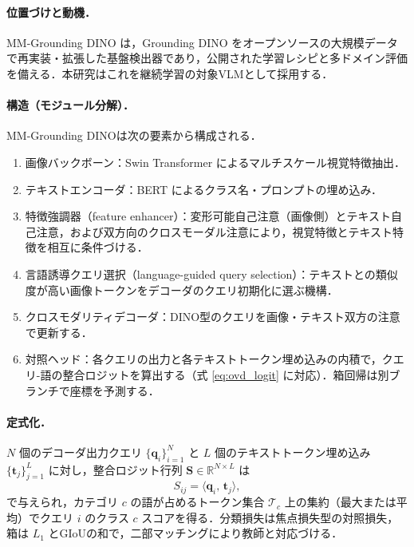 \paragraph{位置づけと動機．}
MM-Grounding DINO \cite{mmgdino} は，Grounding DINO \cite{groundingdino} をオープンソースの大規模データで再実装・拡張した基盤検出器であり，公開された学習レシピと多ドメイン評価を備える．本研究はこれを継続学習の対象VLMとして採用する．

\paragraph{構造（モジュール分解）．}
MM-Grounding DINOは次の要素から構成される．
\begin{enumerate}
\item 画像バックボーン：Swin Transformer によるマルチスケール視覚特徴抽出．
\item テキストエンコーダ：BERT によるクラス名・プロンプトの埋め込み．
\item 特徴強調器（feature enhancer）：変形可能自己注意（画像側）とテキスト自己注意，および双方向のクロスモーダル注意により，視覚特徴とテキスト特徴を相互に条件づける．
\item 言語誘導クエリ選択（language-guided query selection）：テキストとの類似度が高い画像トークンをデコーダのクエリ初期化に選ぶ機構．
\item クロスモダリティデコーダ：DINO型のクエリを画像・テキスト双方の注意で更新する．
\item 対照ヘッド：各クエリの出力と各テキストトークン埋め込みの内積で，クエリ-語の整合ロジットを算出する（式 \eqref{eq:ovd_logit} に対応）．箱回帰は別ブランチで座標を予測する．
\end{enumerate}

\paragraph{定式化．}
$N$ 個のデコーダ出力クエリ $\{\mathbf{q}_{i}\}_{i=1}^{N}$ と $L$ 個のテキストトークン埋め込み $\{\mathbf{t}_{j}\}_{j=1}^{L}$ に対し，整合ロジット行列 $\mathbf{S} \in \mathbb{R}^{N \times L}$ は
\begin{equation}
S_{ij} = \langle \mathbf{q}_{i},\, \mathbf{t}_{j}\rangle,
\label{eq:mmg_logit}
\end{equation}
で与えられ，カテゴリ $c$ の語が占めるトークン集合 $\mathcal{T}_{c}$ 上の集約（最大または平均）でクエリ $i$ のクラス $c$ スコアを得る．分類損失は焦点損失型の対照損失，箱は $L_{1}$ とGIoUの和で，二部マッチングにより教師と対応づける．

